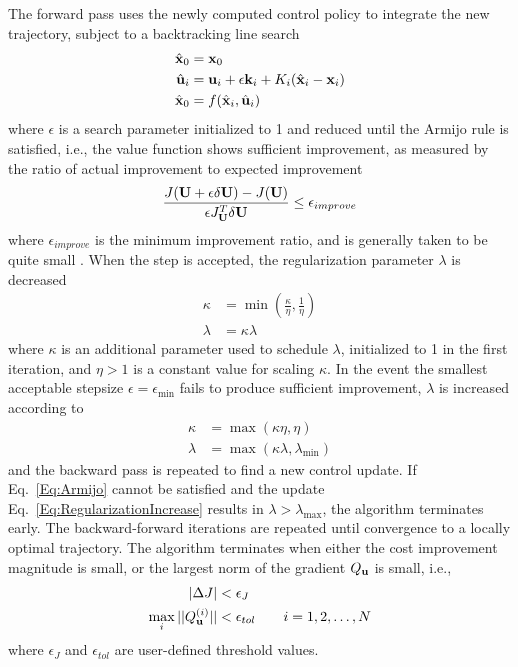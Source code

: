 The forward pass uses the newly computed control policy to integrate the new trajectory, subject to a backtracking line search
\begin{align}
	\hat{\mathbf{x}}_0 &= \mathbf{x}_0 \\
	\hat{\mathbf{u}}_{i} &= \mathbf{u}_i + \epsilon \mathbf{k}_i + K_i(\hat{\mathbf{x}}_i - \mathbf{x}_i)\\
	\hat{\mathbf{x}}_0 &= f(\hat{\mathbf{x}}_i,\hat{\mathbf{u}}_i)
\end{align}
where $\epsilon$ is a search parameter initialized to 1 and reduced until the Armijo rule \cite{Armijo} is satisfied, i.e., the value function shows sufficient improvement, as measured by the ratio of actual improvement to expected improvement
\begin{align}
\frac{J(\mathbf{U} + \epsilon\delta\mathbf{U}) - J(\mathbf{U})}{\epsilon J_{\mathbf{U}}^T\delta\mathbf{U}} \le \epsilon_{improve} \label{Eq:Armijo}
\end{align}
where $\epsilon_{improve}$ is the minimum improvement ratio, and is generally taken to be quite small \cite{Optimization:Nocedal}.
 When the step is accepted, the regularization parameter $\lambda$ is decreased
\begin{align}
\kappa &= \min(\frac{\kappa}{\eta}, \frac{1}{\eta})\\
\lambda &= \kappa\lambda \label{Eq:Regularizationdecrease}
\end{align} 
where $\kappa$ is an additional parameter used to schedule $\lambda$, initialized to 1 in the first iteration, and $\eta>1$ is a constant value for scaling $\kappa$. 
In the event the smallest acceptable stepsize $\epsilon=\epsilon_{\min}$ fails to produce sufficient improvement, $\lambda$ is increased according to
\begin{align}
\kappa &= \max(\kappa\eta, \eta) \\
\lambda &= \max(\kappa\lambda,\lambda_{\min}) \label{Eq:RegularizationIncrease}
\end{align} 
and the backward pass is repeated to find a new control update. If Eq.~\eqref{Eq:Armijo} cannot be satisfied and the update Eq.~\eqref{Eq:RegularizationIncrease} results in $\lambda>\lambda_{\max}$, the algorithm terminates early. 
The backward-forward iterations are repeated until convergence to a locally optimal trajectory. The algorithm terminates when either the cost improvement magnitude is small, or the largest norm of the gradient $Q_{\mathbf{u}}$ is small, i.e.,
\begin{align}
|\Delta J| &< \epsilon_J \label{Eq:ConvergenceCost}\\
\max_i ||Q^{(i)}_{\mathbf{u}}|| &< \epsilon_{tol}\qquad i=1,2,\dots,N \label{Eq:ConvergenceGradient}
\end{align}
where $ \epsilon_J $ and $\epsilon_{tol}$ are user-defined threshold values.

